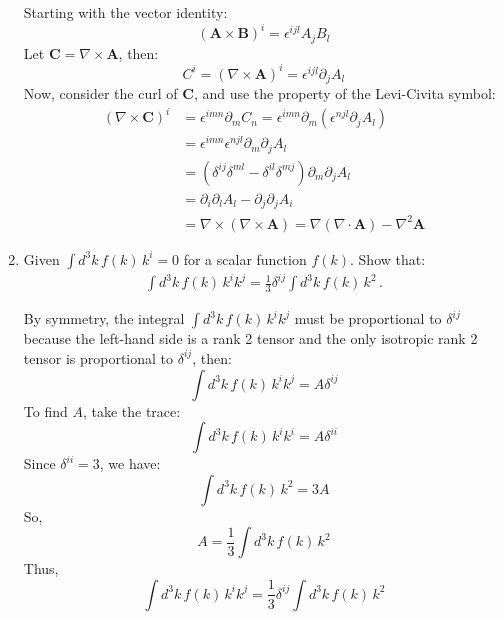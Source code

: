 \begin{enumerate}
          \begin{solution}
              Starting with the vector identity:
              $$(\mathbf{A} \times \mathbf{B})^i = \epsilon^{ijl} A_j B_l $$
              Let $\mathbf{C} = \nabla \times \mathbf{A}$, then:
              $$ C^i = (\nabla \times \mathbf{A})^i = \epsilon^{ijl} \partial_j A_l$$
              Now, consider the curl of $\mathbf{C}$, and use the property of the Levi-Civita symbol:
              \begin{align*}
                  (\nabla \times \mathbf{C})^i & = \epsilon^{imn} \partial_m C_n = \epsilon^{imn} \partial_m (\epsilon^{njl} \partial_j A_l)        \\
                                               & =\epsilon^{imn}\epsilon^{njl}  \partial_m \partial_j A_l                                           \\
                                               & =(\delta^{ij} \delta^{ml} - \delta^{il} \delta^{mj})\partial_m \partial_j A_l                      \\
                                               & =\partial_i \partial_l A_l - \partial_j \partial_j A_i                                             \\
                                               & =\nabla \times (\nabla \times \mathbf{A}) = \nabla (\nabla \cdot \mathbf{A}) - \nabla^2 \mathbf{A}
              \end{align*}
          \end{solution}

    \item Given $\int d^3 k \, f(k) \, k^i = 0$ for a scalar function  $f(k)$. Show that:
          \begin{align}
              \int d^3 k \, f(k) \, k^i k^j = \frac{1}{3} \delta^{ij} \int d^3 k \, f(k) \, k^2\,.
          \end{align}

          \begin{solution}
              By symmetry, the integral $\int d^3 k \, f(k) \, k^i k^j$ must be proportional to $\delta^{ij}$ because the left-hand side is a rank 2 tensor and the only isotropic rank 2 tensor is proportional to $\delta^{ij}$, then:
              $$\int d^3 k \, f(k) \, k^i k^j = A \delta^{ij} $$
              To find $A$, take the trace:
              $$\int d^3 k \, f(k) \, k^i k^i = A \delta^{ii}$$
              Since $\delta^{ii} = 3$, we have:
              $$\int d^3 k \, f(k) \, k^2 = 3A$$
              So,
              $$A = \frac{1}{3} \int d^3 k \, f(k) \, k^2$$
              Thus,
              $$\int d^3 k \, f(k) \, k^i k^j = \frac{1}{3} \delta^{ij} \int d^3 k \, f(k) \, k^2 $$
          \end{solution}


\end{enumerate}
